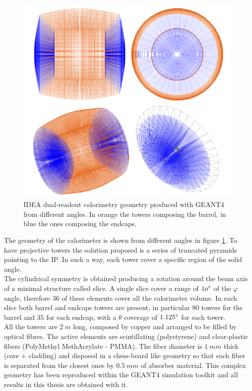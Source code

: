 \begin{figure}
	\centering
	\includegraphics[width=.9\textwidth]{IMG/Cap1/DRCal_geo.png}
	\caption{IDEA dual-readout calorimetry geometry produced with GEANT4 from different angles. In orange the towers composing the barrel, in blue the ones composing the endcaps.}
	\label{fig:DRCal_geo}
\end{figure}

The geometry of the calorimeter is shown from different angles in figure \ref{fig:DRCal_geo}. To have projective towers the solution proposed is a series of truncated pyramids pointing to the IP. In such a way, each tower cover a specific region of the solid angle.\\
The cylindrical symmetry is obtained producing a rotation around the beam axis of a minimal structure called slice. A single slice cover a range of $1o\degree$ of the $\varphi$ angle, therefore $36$ of these elements cover all the calorimeter volume.
In each slice both barrel and endcaps towers are present, in particular $80$ towers for the barrel and $35$ for each endcap, with a $\theta$ coverage of $1.125\degree$ for each tower.\\
All the towers are $2\ m$ long, composed by copper and arranged to be filled by optical fibres.
The active elements are scintillating (polystyrene) and clear-plastic fibers (PolyMethyl MethAcrylate - PMMA).
The fiber diameter is $1\ mm$ thick (core + cladding) and disposed in a chess-board like geometry so that each fiber is separated from the closest ones by $0.5\ mm$ of absorber material.
This complex geometry has been reproduced within the GEANT4 simulation toolkit \cite{GEANT4} and all results in this thesis are obtained with it.

